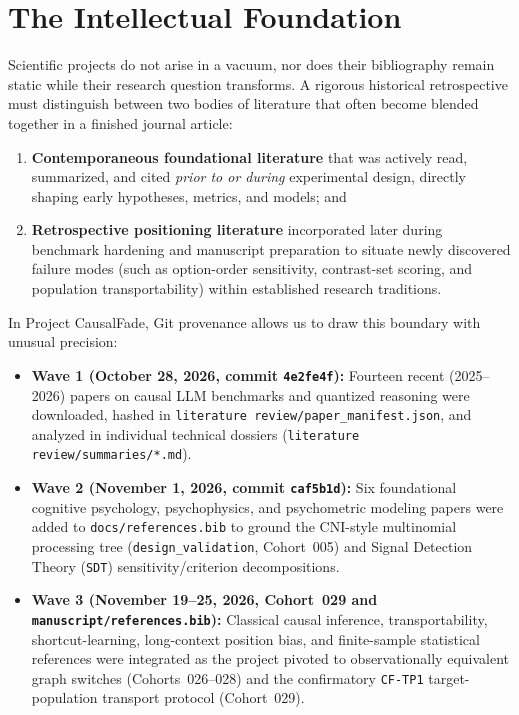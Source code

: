 \chapter{The Intellectual Foundation}\label{ch:literature}

Scientific projects do not arise in a vacuum, nor does their bibliography remain static while their research question transforms. A rigorous historical retrospective must distinguish between two bodies of literature that often become blended together in a finished journal article:
\begin{enumerate}
  \item \textbf{Contemporaneous foundational literature} that was actively read, summarized, and cited \emph{prior to or during} experimental design, directly shaping early hypotheses, metrics, and models; and
  \item \textbf{Retrospective positioning literature} incorporated later during benchmark hardening and manuscript preparation to situate newly discovered failure modes (such as option-order sensitivity, contrast-set scoring, and population transportability) within established research traditions.
\end{enumerate}

In Project CausalFade, Git provenance allows us to draw this boundary with unusual precision:
\begin{itemize}
  \item \textbf{Wave 1 (October 28, 2026, commit \texttt{4e2fe4f}):} Fourteen recent (2025--2026) papers on causal LLM benchmarks and quantized reasoning were downloaded, hashed in \texttt{literature review/paper\_manifest.json}, and analyzed in individual technical dossiers (\texttt{literature review/summaries/*.md}).
  \item \textbf{Wave 2 (November 1, 2026, commit \texttt{caf5b1d}):} Six foundational cognitive psychology, psychophysics, and psychometric modeling papers were added to \texttt{docs/references.bib} to ground the CNI-style multinomial processing tree (\texttt{design\_validation}, Cohort~005) and Signal Detection Theory (\texttt{SDT}) sensitivity/criterion decompositions.
  \item \textbf{Wave 3 (November 19--25, 2026, Cohort~029 and \texttt{manuscript/references.bib}):} Classical causal inference, transportability, shortcut-learning, long-context position bias, and finite-sample statistical references were integrated as the project pivoted to observationally equivalent graph switches (Cohorts~026--028) and the confirmatory \texttt{CF-TP1} target-population transport protocol (Cohort~029).
\end{itemize}

